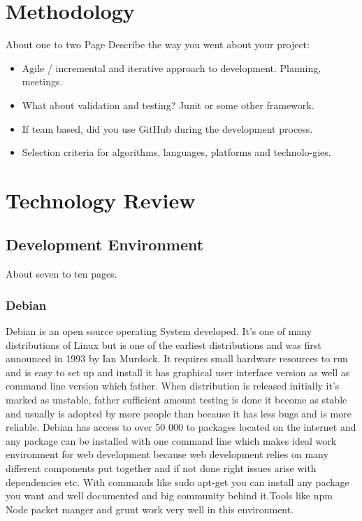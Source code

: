\chapter{Methodology}
About one to two Page
Describe the way you went about your project:
\begin{itemize}
\item Agile / incremental and iterative approach to development. Planning, meetings.
\item What about validation and testing? Junit or some other framework.
\item If team based, did you use GitHub during the development process.
\item Selection criteria for algorithms, languages, platforms and technolo-gies.
\end{itemize}



\chapter{Technology Review}
\section{Development Environment}
About seven to ten pages.
\subsection{Debian}
\bigbreak
Debian is an open source operating System developed. It’s one of many distributions of Linux but is one of the earliest distributions and was first announced in 1993 by Ian Murdock. It requires small hardware resources to run and is easy to set up and install it has graphical user interface version as well as command line version which father. When distribution is released initially it’s marked as unstable, father sufficient amount testing is done it become as stable and usually is adopted by more people than because it has less bugs and is more reliable. Debian has access to over 50 000 to packages located on the internet and any package can be installed with one command line which makes ideal work environment for web development because web development relies on many different components put together and if not done right issues arise with dependencies etc. With commands like sudo apt-get you can install any package you want and well documented and big community behind it.Tools like npm Node packet manger and grunt work very well in this environment.

